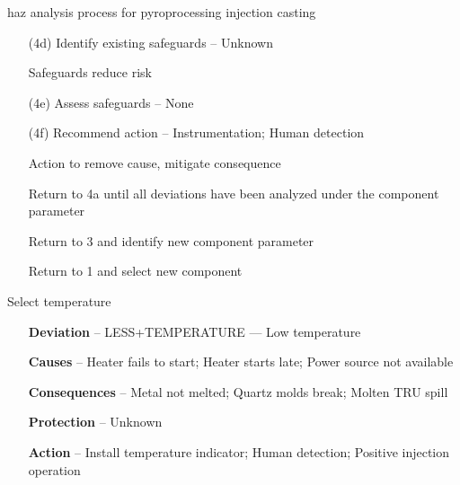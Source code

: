 \documentclass[aspectratio=1610,pdftex,dvipsnames,compress,xcolor={dvipsnames}]{beamer}
\newcommand{\acs}{\acrshort} %
\begin{document}
\begin{frame}{\acs{haz} analysis process for pyroprocessing injection casting}
    \begin{enumerate}[series=outerlist,topsep=0pt,itemsep=1pt,leftmargin=*,label=(\arabic*)]
        \item[(4d)]Identify existing safeguards -- Unknown
        \item[]Safeguards reduce risk
            \vspace{0.15in}
        \item[(4e)]Assess safeguards -- None
            \vspace{0.15in}
        \item[(4f)]Recommend action -- Instrumentation; Human detection
        \item[]Action to remove cause, mitigate consequence
            \vspace{0.15in}
        \item[]Return to 4a until all deviations have been analyzed under the component parameter
            \vspace{0.15in}
        \item[]Return to 3 and identify new component parameter
            \vspace{0.15in}
        \item[]Return to 1 and select new component
    \end{enumerate}
\end{frame}


\begin{frame}{Select temperature}
    \begin{enumerate}[series=outerlist,topsep=0pt,itemsep=21pt,leftmargin=*,label=(\arabic*)]
        \item[]\textbf{Deviation} -- LESS+TEMPERATURE --- Low temperature
        \item[]\textbf{Causes} -- Heater fails to start; Heater starts late; Power source not available
        \item[]\textbf{Consequences} -- Metal not melted; Quartz molds break; Molten TRU spill
        \item[]\textbf{Protection} -- Unknown
        \item[]\textbf{Action} -- Install temperature indicator; Human detection; Positive injection operation
    \end{enumerate}
\end{frame}
\end{document}
